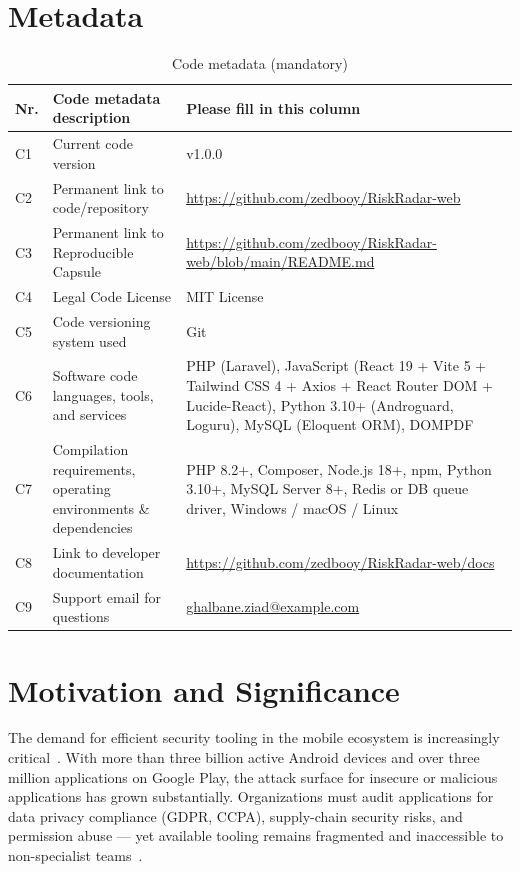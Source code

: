 \documentclass[3p,times]{elsarticle}
\begin{document}
\section*{Metadata}

\begin{table}[H]
\small
\begin{tabular}{|l|p{5cm}|p{8cm}|}
\hline
\textbf{Nr.} & \textbf{Code metadata description} & \textbf{Please fill in this column} \\
\hline
C1 & Current code version & v1.0.0 \\
\hline
C2 & Permanent link to code/repository &
\url{https://github.com/zedbooy/RiskRadar-web} \\
\hline
C3 & Permanent link to Reproducible Capsule &
\url{https://github.com/zedbooy/RiskRadar-web/blob/main/README.md} \\
\hline
C4 & Legal Code License & MIT License \\
\hline
C5 & Code versioning system used & Git \\
\hline
C6 & Software code languages, tools, and services &
PHP (Laravel), JavaScript (React 19 + Vite 5 + Tailwind CSS 4 +
Axios + React Router DOM + Lucide-React),
Python 3.10+ (Androguard, Loguru), MySQL (Eloquent ORM), DOMPDF \\
\hline
C7 & Compilation requirements, operating environments \& dependencies &
PHP 8.2+, Composer, Node.js 18+, npm, Python 3.10+,
MySQL Server 8+, Redis or DB queue driver,
Windows / macOS / Linux \\
\hline
C8 & Link to developer documentation &
\url{https://github.com/zedbooy/RiskRadar-web/docs} \\
\hline
C9 & Support email for questions &
\href{mailto:ghalbane.ziad@example.com}{ghalbane.ziad@example.com} \\
\hline
\end{tabular}
\caption{Code metadata (mandatory)}
\end{table}

\section{Motivation and Significance}

The demand for efficient security tooling in the mobile ecosystem is increasingly
critical~\cite{ref1}. With more than three billion active Android devices and
over three million applications on Google Play, the attack surface for insecure
or malicious applications has grown substantially. Organizations must audit
applications for data privacy compliance (GDPR, CCPA), supply-chain security
risks, and permission abuse — yet available tooling remains fragmented and
inaccessible to non-specialist teams~\cite{ref2}.
\end{document}

